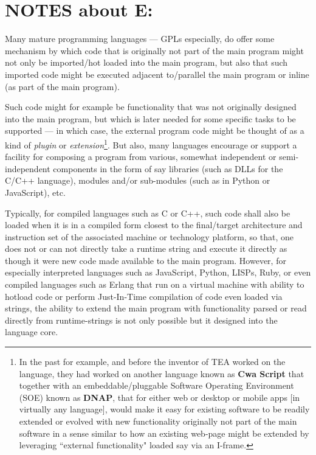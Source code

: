 \documentclass[a4paper, 18pt]{book} %
\begin{document}
\section{NOTES about E:}
\label{SECNOTESE} 


Many mature programming languages --- GPLs especially, do offer some mechanism by which code that is originally not part of the main program might not only be imported/hot loaded into the main program, but also that such imported code might be executed adjacent to/parallel the main program or inline (as part of the main program). 

\vspace{1em}

Such code might for example be functionality that was not originally designed into the main program, but which is later needed for some specific tasks to be supported --- in which case, the external program code might be thought of as a kind of \textit{plugin} or \textit{extension}\footnote{In the past for example, and before the inventor of TEA worked on the language, they had worked on another language known as \textbf{Cwa Script} that together with an embeddable/pluggable Software Operating Environment (SOE)  known as \textbf{DNAP}\cite{lutalo2023dnapsoe}, that for either web or desktop or mobile apps [in virtually any language], would make it easy for existing software to be readily extended or evolved with new functionality originally not part of the main software in a sense similar to how an existing web-page might be extended by leveraging ``external functionality" loaded say via an I-frame.}. But also, many languages encourage or support a facility for composing a program from various, somewhat independent or semi-independent components in the form of say libraries (such as DLLs for the C/C++ language), modules and/or sub-modules (such as in Python or JavaScript), etc.  

\vspace{1em}

Typically, for compiled languages such as C or C++, such code shall also be loaded when it is in a compiled form closest to the final/target architecture and instruction set of the associated machine or technology platform, so that, one does not or can not directly take a runtime string and execute it directly as though it were new code made available to the main program. However, for especially interpreted languages such as JavaScript, Python, LISPs, Ruby, or even compiled languages such as Erlang that run on a virtual machine with ability to hotload code or perform Just-In-Time compilation of code even loaded via strings, the ability to extend the main program with functionality parsed or read directly  from runtime-strings is not only possible but it designed into the language core.
\end{document}
